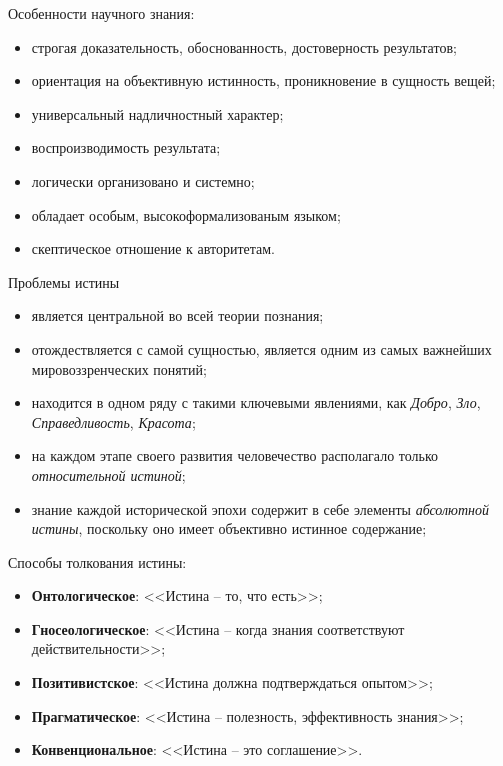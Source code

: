 Особенности научного знания:
\begin{itemize}
    \item строгая доказательность, обоснованность, достоверность результатов;
    \item ориентация на объективную истинность, проникновение в сущность вещей;
    \item универсальный надличностный характер;
    \item воспроизводимость результата;
    \item логически организовано и системно;
    \item обладает особым, высокоформализованым языком;
    \item скептическое отношение к авторитетам.
\end{itemize}

Проблемы истины
\begin{itemize}
    \item является центральной во всей теории познания;
    \item отождествляется с самой сущностью, является одним из самых важнейших мировоззренческих понятий;
    \item находится в одном ряду с такими ключевыми явлениями, как \emph{Добро}, \emph{Зло}, 
        \emph{Справедливость}, \emph{Красота};
    \item на каждом этапе своего развития человечество располагало только \emph{относительной истиной};
    \item знание каждой исторической эпохи содержит в себе элементы \emph{абсолютной истины}, поскольку оно 
        имеет объективно истинное содержание;
\end{itemize}

Способы толкования истины:
\begin{itemize}
    \item \textbf{Онтологическое}: <<Истина -- то, что есть>>;
    \item \textbf{Гносеологическое}: <<Истина -- когда знания соответствуют действительности>>;
    \item \textbf{Позитивистское}: <<Истина должна подтверждаться опытом>>;
    \item \textbf{Прагматическое}: <<Истина -- полезность, эффективность знания>>;
    \item \textbf{Конвенциональное}: <<Истина -- это соглашение>>.
\end{itemize}

